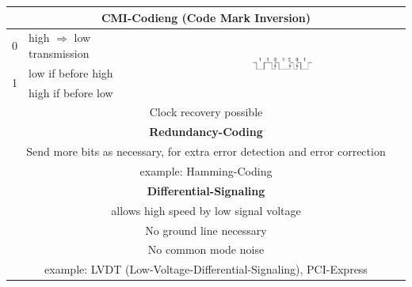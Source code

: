 \begin{table}[!h]
\begin{tabular}{|c|l|c|}
		\multicolumn{3}{|c|}{\textbf{CMI-Codieng (Code Mark Inversion)}}                                                                                           \\ \hline
		        0          & high $\Rightarrow$ low transmission & \multirow{3}{*}{\includegraphics[width=0.25\textwidth]{images/High_Speed_Digital/CMI-Code.pdf}} \\
		\multirow{2}{*}{1} & low \quad if before high            &  \\
		                   & high \quad if before low            &  \\ \hline
		\multicolumn{3}{|c|}{Clock recovery possible}                                                                                                              \\ \hline\hline
		
		\multicolumn{3}{|c|}{\textbf{Redundancy-Coding}}                                                                                                           \\ \hline
		\multicolumn{3}{|c|}{Send more bits as necessary, for extra error detection and error correction}                                                          \\ \hline
		\multicolumn{3}{|c|}{example: Hamming-Coding}                                                                                                              \\ \hline\hline
		
		\multicolumn{3}{|c|}{\textbf{Differential-Signaling}}                                                                                                      \\ \hline
		\multicolumn{3}{|c|}{allows high speed by low signal voltage}                                                                                              \\ \hline
		\multicolumn{3}{|c|}{No ground line necessary}                                                                                                             \\ \hline
		\multicolumn{3}{|c|}{No common mode noise}                                                                                                                 \\ \hline
		\multicolumn{3}{|c|}{example: LVDT (Low-Voltage-Differential-Signaling), PCI-Express}                                                                      \\ \hline\hline
		

\end{tabular}
\end{table}
